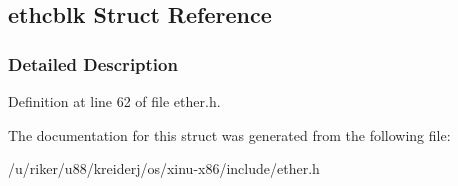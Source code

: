 \hypertarget{structethcblk}{}\subsection{ethcblk Struct Reference}
\label{structethcblk}


\subsubsection{Detailed Description}


Definition at line 62 of file ether.\+h.



The documentation for this struct was generated from the following file\+:\begin{DoxyCompactItemize}
\item 
/u/riker/u88/kreiderj/os/xinu-\/x86/include/ether.\+h\end{DoxyCompactItemize}
